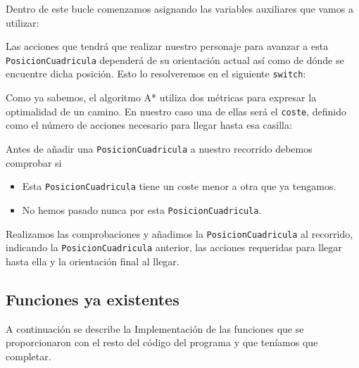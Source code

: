 \documentclass[11pt,a4paper]{article}
\begin{document}


Dentro de este bucle comenzamos asignando las variables auxiliares que vamos a utilizar:



Las acciones que tendrá que realizar nuestro personaje para avanzar a esta \texttt{PosicionCuadricula} dependerá de su orientación actual así como de dónde se encuentre dicha posición. Esto lo resolveremos en el siguiente \texttt{switch}:



Como ya sabemos, el algoritmo A* utiliza dos métricas para expresar la optimalidad de un camino. En nuestro caso una de ellas será el \texttt{coste}, definido como el número de acciones necesario para llegar hasta esa casilla:



Antes de añadir una \texttt{PosicionCuadricula} a nuestro recorrido debemos comprobar si \begin{itemize}
  \item Esta \texttt{PosicionCuadricula} tiene un coste menor a otra que ya tengamos.
  \item No hemos pasado nunca por esta \texttt{PosicionCuadricula}.
\end{itemize}



Realizamos las comprobaciones y añadimos la \texttt{PosicionCuadricula} al recorrido, indicando la \texttt{PosicionCuadricula} anterior, las acciones requeridas para llegar hasta ella y la orientación final al llegar.



\subsection*{Funciones ya existentes}%
\label{sec:funciones_ya_existentes}

A continuación se describe la Implementación de las funciones que se proporcionaron con el resto del código del programa y que teníamos que completar.
\end{document}
